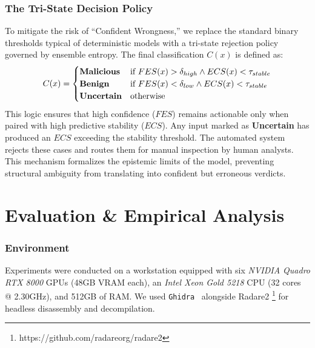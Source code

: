 \documentclass[pdflatex,sn-mathphys-num]{sn-jnl}
\begin{document}
\subsubsection{The Tri-State Decision Policy}
To mitigate the risk of ``Confident Wrongness,'' we replace the standard binary thresholds typical of deterministic models with a tri-state rejection policy governed by ensemble entropy. The final classification $C(x)$ is defined as:
\begin{equation}
    \displaystyle
    C(x) = 
    \begin{cases} 
    \text{\textbf{Malicious}} & \text{if } FES(x) > \delta_{high} \land ECS(x) < \tau_{stable} \\
    \text{\textbf{Benign}} & \text{if } FES(x) < \delta_{low} \land ECS(x) < \tau_{stable} \\
    \text{\textbf{Uncertain}} & \text{otherwise} 
    \end{cases}
\end{equation}
This logic ensures that high confidence ($FES$) remains actionable only when paired with high predictive stability ($ECS$). Any input marked as \textbf{Uncertain} has produced an $ECS$ exceeding the stability threshold. The automated system rejects these cases and routes them for manual inspection by human analysts. This mechanism formalizes the epistemic limits of the model, preventing structural ambiguity from translating into confident but erroneous verdicts.


\section{Evaluation \& Empirical Analysis}
\label{sec:evaluation}

\subsubsection{Environment}
Experiments were conducted on a workstation equipped with six \textit{NVIDIA Quadro RTX 8000} GPUs (48GB VRAM each), an \textit{Intel Xeon Gold 5218} CPU (32 cores @ 2.30GHz), and 512GB of RAM. We used \texttt{Ghidra}~\cite{ghidra} alongside Radare2 \footnote{https://github.com/radareorg/radare2} for headless disassembly and decompilation.
\end{document}
